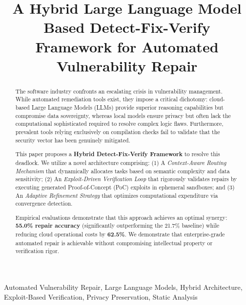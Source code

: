 \documentclass[conference]{IEEEtran}
\begin{document}
\title{A Hybrid Large Language Model Based Detect-Fix-Verify Framework for Automated Vulnerability Repair}

\author{
}

\maketitle

\begin{abstract}
The software industry confronts an escalating crisis in vulnerability management. While automated remediation tools exist, they impose a critical dichotomy: cloud-based Large Language Models (LLMs) provide superior reasoning capabilities but compromise data sovereignty, whereas local models ensure privacy but often lack the computational sophisticated required to resolve complex logic flaws. Furthermore, prevalent tools relying exclusively on compilation checks fail to validate that the security vector has been genuinely mitigated.

This paper proposes a \textbf{Hybrid Detect-Fix-Verify Framework} to resolve this deadlock. We utilize a novel architecture comprising: (1) A \textit{Context-Aware Routing Mechanism} that dynamically allocates tasks based on semantic complexity and data sensitivity; (2) An \textit{Exploit-Driven Verification Loop} that rigorously validates repairs by executing generated Proof-of-Concept (PoC) exploits in ephemeral sandboxes; and (3) An \textit{Adaptive Refinement Strategy} that optimizes computational expenditure via convergence detection.

Empirical evaluations demonstrate that this approach achieves an optimal synergy: \textbf{55.0\% repair accuracy} (significantly outperforming the 21.7\% baseline) while reducing cloud operational costs by \textbf{62.5\%}. We demonstrate that enterprise-grade automated repair is achievable without compromising intellectual property or verification rigor.
\end{abstract}

\begin{IEEEkeywords}
Automated Vulnerability Repair, Large Language Models, Hybrid Architecture, Exploit-Based Verification, Privacy Preservation, Static Analysis
\end{IEEEkeywords}
\end{document}
